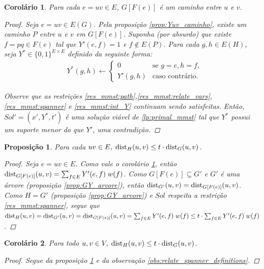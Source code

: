 \documentclass[11pt,reqno]{amsart}
\newcommand{\dist}{{\rm dist}}
\newtheorem{proposicao}{Proposição}
\newtheorem{corolario}{Corolário}
\begin{document}
\begin{corolario}
\label{corol:Yuv_define_caminho}
Para cada $e = uv \in E$, $G[F(e)]$ é um 
caminho entre $u$ e $v$.
\begin{proof}
Seja $e = uv \in E(G)$. Pela proposição \ref{prop:Yuv_caminho}, existe um 
caminho $P$ entre $u$ e $v$ em $G[F(e)]$. Suponha (por absurdo) que existe 
$f = pq \in F(e)$ tal que $Y'(e,f) = 1$ e $f \notin E(P)$. Para cada 
$g,h \in E(H)$, seja $Y^* \in \{0,1\}^{E \times E}$ definido da seguinte forma: 
\begin{align*}
&Y^*(g,h)\leftarrow
\begin{cases}
    0& \text{se $g = e, h = f,$}\\
    Y'(g,h)& \text{caso contrário.}
\end{cases}
\end{align*}

Observe que as restrições 
\ref{res_mmst:path},\ref{res_mmst:relate_vars}, \ref{res_mmst:spanner} e 
\ref{res_mmst:int_Y} continuam sendo satisfeitas. 
Então, $Sol' = (x', Y^*, t')$
 é uma solução viável de \ref{lp:primal_mmst} tal que $Y^*$ possui um suporte 
menor do que $Y'$, uma contradição.
\end{proof}
\end{corolario}

\begin{proposicao}
\label{prop:x_spanner}
Para cada $uv \in E,\;\dist_{H}(u,v) \le t \cdot \dist_{G}(u,v)$.
\begin{proof}
Seja $e=uv \in E$.
Como vale o corolário 
\ref{corol:Yuv_define_caminho}, então \\
\mbox{$\dist_{G[F(e)]}(u,v) = \sum_{f \in E}Y'(e,f)\;w(f)$}. 
Como $G[F(e)] \subseteq G'$ e $G'$ é uma árvore 
(proposição \ref{prop:GY_arvore}), então 
\mbox{$\dist_{G'}(u,v) = \dist_{G[F(e)]}(u,v)$}. Como $H = G'$ (proposição 
\ref{prop:GY_arvore}) e $Sol$ respeita a restrição \ref{res_mmst:spanner}, 
segue que \\
$\dist_{H}(u,v) = \dist_{G'}(u,v) = \dist_{G[F(e)]}(u,v) = \sum_{f \in E} Y'(e,f) \; w(f) \le t \cdot \sum_{f \in E}Y'(e,f)\;w(f)$.
\end{proof}
\end{proposicao}

\begin{corolario}
\label{corol:standard_spanner}
Para todo $u,v \in V,\;\dist_{H}(u,v) \le t \cdot \dist_{G}(u,v)$.
\begin{proof}
Segue da proposição \ref{prop:x_spanner} e da observação 
\ref{obs:relate_spanner_definitions}.
\end{proof}
\end{corolario}
\end{document}
